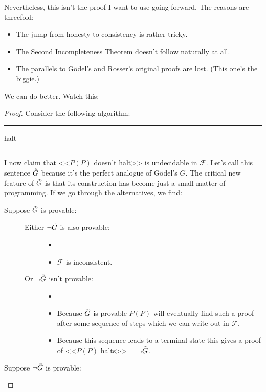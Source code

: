\documentclass{article}
\newcommand{\F}{\ensuremath{\mathcal{F}}}
\newcommand{\iGoedel}{\ensuremath{\accentset{\scalebox{0.35}{$\infty$}}{G}}}
\newenvironment{algo}{\begin{samepage}\medskip\hrule\begin{algorithmic}[H]}{\end{algorithmic}\hrule\medskip\end{samepage}}
\begin{document}
Nevertheless, this isn't the proof I want to use going forward. The reasons are threefold:
\begin{itemize}[label=$\bullet$]
\item The jump from honesty to consistency is rather tricky.
\item The Second Incompleteness Theorem doesn't follow naturally at all.
\item The parallels to Gödel's and Rosser's original proofs are lost. (This one's the biggie.)
\end{itemize}
We can do better. Watch this:
\begin{proof}
Consider the following algorithm:
\begin{algo}
      \State halt
    \EndIf
  \EndFor
\EndFunction
\end{algo}
I now claim that <<$P(P)$ doesn't halt>> is undecidable in $\F$. Let's call this sentence $\iGoedel$ because it's the perfect analogue of Gödel's $G$. The critical new feature of $\iGoedel$ is that its construction has become just a small matter of programming. If we go through the alternatives, we find:
\begin{description}
\item[Suppose $\iGoedel$ is provable:]
\begin{description}
\item[]
\item[Either $\neg \iGoedel$ is also provable:]
\begin{itemize}
\item[]
\item $\F$ is inconsistent. \lightning
\end{itemize}
\item[Or $\neg \iGoedel$ isn't provable:]
\begin{itemize}
\item[]
\item Because $\iGoedel$ is provable $P(P)$ will eventually find such a proof after some sequence of steps which we can write out in $\F$.
\item Because this sequence leads to a terminal state this gives a proof of <<$P(P)$ halts>> = $\neg \iGoedel$. \lightning
\end{itemize}
\end{description}
\item[Suppose $\neg \iGoedel$ is provable:]
\begin{description}

\end{description}
\end{description}
\end{proof}
\end{document}
